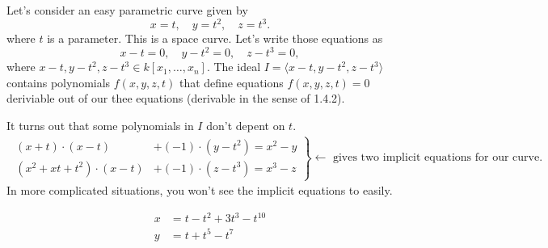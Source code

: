 \begin{example}[title = Example 1.4.4 (The use of ideals in the context of implicitization)]
    Let's consider an easy parametric curve given by 
      \[x = t, \quad y = t^2, \quad   z = t^3.\]
     where $t$ is a parameter. This is a space curve. Let's write those equations as 
     \[x - t = 0, \quad y - t^2 = 0, \quad z - t^3 = 0, \] 
    where $x-t, y-t^2, z-t^3 \in k[x_1, \dots, x_n]$. The ideal $I = \langle x-t, y-t^2, z-t^3 \rangle$ contains polynomials $f(x,y,z,t)$ that define equations $f(x,y,z,t) = 0$
    deriviable out of our thee equations (derivable in the sense of 1.4.2).   

    It turns out that some polynomials in $I$ don't depent on $t$. 
    \begin{align*}
        \left. 
        \begin{aligned}
            (x+t) \cdot (x-t) &+ (-1)\cdot (y-t^2) = x^2 -y \\
            (x^2 + xt + t^2) \cdot (x-t) &+ (-1) \cdot (z - t^3)  = x^3 - z 
        \end{aligned} \right\} \leftarrow \text{ gives two implicit equations for our curve.}
    \end{align*} 
    In more complicated situations, you won't see the implicit equations to easily.   

    \begin{minipage}{0.59\textwidth}
       \begin{center}
        \end{center} 
    \end{minipage}
    \hspace*{0.2cm}
    \begin{minipage}{0.39\textwidth}
        \begin{align*}
            x &= t - t^2 + 3t^3 - t^{10} \\
            y &= t + t^5  - t^7
        \end{align*}
    \end{minipage}  
\end{example} 


